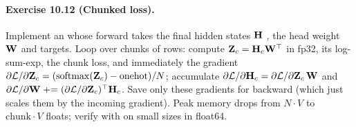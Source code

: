 \paragraph{Exercise 10.12 (Chunked loss).}
Implement an  whose forward takes the final hidden states $\mathbf{H}$
, the head weight $\mathbf{W}$  and targets. Loop over chunks of rows: compute
$\mathbf{Z}_c=\mathbf{H}_c\mathbf{W}^\top$ in fp32, its log-sum-exp, the chunk loss, and immediately the
gradient $\partial\mathcal L/\partial\mathbf{Z}_c=(\operatorname{softmax}(\mathbf{Z}_c)-\text{onehot})/N$; accumulate
$\partial\mathcal L/\partial\mathbf{H}_c=\partial\mathcal L/\partial\mathbf{Z}_c\,\mathbf{W}$ and
$\partial\mathcal L/\partial\mathbf{W}\mathrel{+}=(\partial\mathcal L/\partial\mathbf{Z}_c)^\top\mathbf{H}_c$.
Save only these gradients for backward (which just scales them by the incoming gradient). Peak
memory drops from $N\cdot V$ to $\text{chunk}\cdot V$ floats; verify with
 on small sizes in float64.
